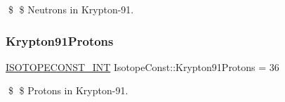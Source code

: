 \$ \$ Neutrons in Krypton-\/91. \mbox{\label{group___isotope_const-_krypton-_kr91_ga05c7299c79f1ec88967b1696d465eb64}} 
\subsubsection{\texorpdfstring{Krypton91\+Protons}{Krypton91Protons}}
{\footnotesize\ttfamily \mbox{\hyperlink{group___isotope_const-_macros_ga5f18360b3e99483a35c32d789e62621c}{I\+S\+O\+T\+O\+P\+E\+C\+O\+N\+S\+T\+\_\+\+I\+NT}} Isotope\+Const\+::\+Krypton91\+Protons = 36}

\$ \$ Protons in Krypton-\/91. 